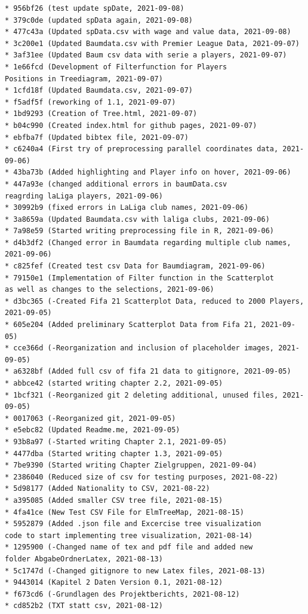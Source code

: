 \documentclass[usegeometry=true]{scrartcl}
\begin{document}
\begin{verbatim}
* 956bf26 (test update spDate, 2021-09-08)
* 379c0de (updated spData again, 2021-09-08)
* 477c43a (Updated spData.csv with wage and value data, 2021-09-08)
* 3c200e1 (Updated Baumdata.csv with Premier League Data, 2021-09-07)
* 3af31ee (Updated Baum csv data with serie a players, 2021-09-07)
* 1e66fcd (Development of Filterfunction for Players 
Positions in Treediagram, 2021-09-07)
* 1cfd18f (Updated Baumdata.csv, 2021-09-07)
* f5adf5f (reworking of 1.1, 2021-09-07)
* 1bd9293 (Creation of Tree.html, 2021-09-07)
* b04c990 (Created index.html for github pages, 2021-09-07)
* ebfba7f (Updated bibtex file, 2021-09-07)
* c6240a4 (First try of preprocessing parallel coordinates data, 2021-09-06)
* 43ba73b (Added highlighting and Player info on hover, 2021-09-06)
* 447a93e (changed additional errors in baumData.csv 
reagrding laLiga players, 2021-09-06)
* 30992b9 (fixed errors in LaLiga club names, 2021-09-06)
* 3a8659a (Updated Baumdata.csv with laliga clubs, 2021-09-06)
* 7a98e59 (Started writing preprocessing file in R, 2021-09-06)
* d4b3df2 (Changed error in Baumdata regarding multiple club names, 2021-09-06)
* c825fef (Created test csv Data for Baumdiagram, 2021-09-06)
* 79150e1 (Implementation of Filter function in the Scatterplot 
as well as changes to the selections, 2021-09-06)
* d3bc365 (-Created Fifa 21 Scatterplot Data, reduced to 2000 Players, 2021-09-05)
* 605e204 (Added preliminary Scatterplot Data from Fifa 21, 2021-09-05)
* cce366d (-Reorganization and inclusion of placeholder images, 2021-09-05)
* a6328bf (Added full csv of fifa 21 data to gitignore, 2021-09-05)
* abbce42 (started writing chapter 2.2, 2021-09-05)
* 1bcf321 (-Reorganized git 2 deleting additional, unused files, 2021-09-05)
* 0017063 (-Reorganized git, 2021-09-05)
* e5ebc82 (Updated Readme.me, 2021-09-05)
* 93b8a97 (-Started writing Chapter 2.1, 2021-09-05)
* 4477dba (Started writing chapter 1.3, 2021-09-05)
* 7be9390 (Started writing Chapter Zielgruppen, 2021-09-04)
* 2386040 (Reduced size of csv for testing purposes, 2021-08-22)
* 5d98177 (Added Nationality to CSV, 2021-08-22)
* a395085 (Added smaller CSV tree file, 2021-08-15)
* 4fa41ce (New Test CSV File for ElmTreeMap, 2021-08-15)
* 5952879 (Added .json file and Excercise tree visualization 
code to start implementing tree visualization, 2021-08-14)
* 1295900 (-Changed name of tex and pdf file and added new 
folder AbgabeOrdnerLatex, 2021-08-13)
* 5c1747d (-Changed gitignore to new Latex files, 2021-08-13)
* 9443014 (Kapitel 2 Daten Version 0.1, 2021-08-12)
* f673cd6 (-Grundlagen des Projektberichts, 2021-08-12)
* cd852b2 (TXT statt csv, 2021-08-12)

\end{verbatim}
\end{document}
